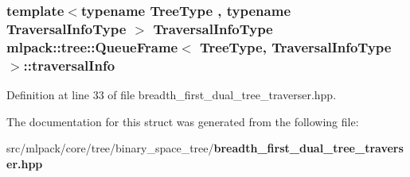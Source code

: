 \subsubsection[{traversal\+Info}]{\setlength{\rightskip}{0pt plus 5cm}template$<$typename Tree\+Type , typename Traversal\+Info\+Type $>$ Traversal\+Info\+Type {\bf mlpack\+::tree\+::\+Queue\+Frame}$<$ Tree\+Type, Traversal\+Info\+Type $>$\+::traversal\+Info}\label{structmlpack_1_1tree_1_1QueueFrame_a6628f67f985180a60ceb80716d84def1}


Definition at line 33 of file breadth\+\_\+first\+\_\+dual\+\_\+tree\+\_\+traverser.\+hpp.



The documentation for this struct was generated from the following file\+:\begin{DoxyCompactItemize}
\item 
src/mlpack/core/tree/binary\+\_\+space\+\_\+tree/{\bf breadth\+\_\+first\+\_\+dual\+\_\+tree\+\_\+traverser.\+hpp}\end{DoxyCompactItemize}
